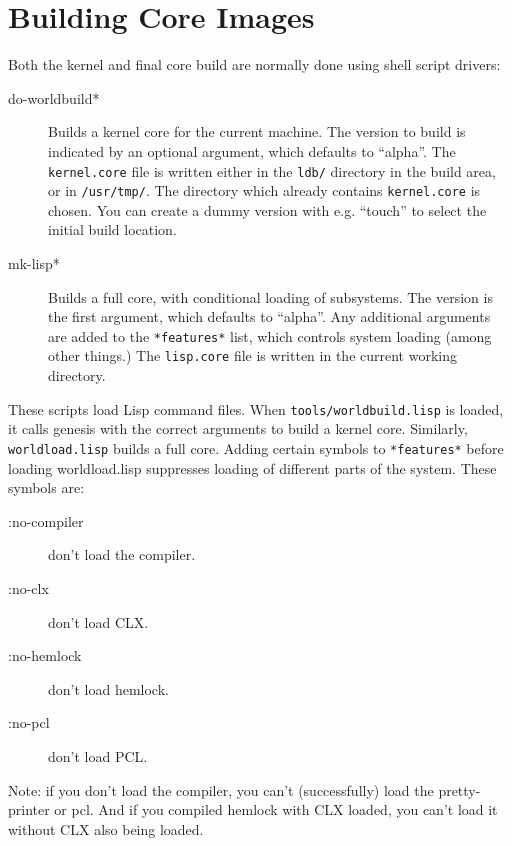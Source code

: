 \section{Building Core Images}
\label{building-cores}
Both the kernel and final core build are normally done using shell script
drivers:
\begin{description}
\item[do-worldbuild*] Builds a kernel core for the current machine.  The
version to build is indicated by an optional argument, which defaults to
``alpha''.  The \verb|kernel.core| file is written either in the \verb|ldb/|
directory in the build area, or in \verb|/usr/tmp/|.  The directory which
already contains \verb|kernel.core| is chosen.  You can create a dummy version
with e.g. ``touch'' to select the initial build location.

\item[mk-lisp*] Builds a full core, with conditional loading of subsystems.
The version is the first argument, which defaults to ``alpha''.  Any additional
arguments are added to the \verb|*features*| list, which controls system
loading (among other things.)  The \verb|lisp.core| file is written in the
current working directory.
\end{description}

These scripts load Lisp command files.  When \verb|tools/worldbuild.lisp| is
loaded, it calls genesis with the correct arguments to build a kernel core.
Similarly, \verb|worldload.lisp|
builds a full core.  Adding certain symbols to \verb|*features*| before
loading worldload.lisp suppresses loading of different parts of the
system.  These symbols are:
\begin{description}
\item[:no-compiler] don't load the compiler.
\item[:no-clx] don't load CLX.
\item[:no-hemlock] don't load hemlock.
\item[:no-pcl] don't load PCL.
\end{description}

Note: if you don't load the compiler, you can't (successfully) load the
pretty-printer or pcl.  And if you compiled hemlock with CLX loaded, you can't
load it without CLX also being loaded.

